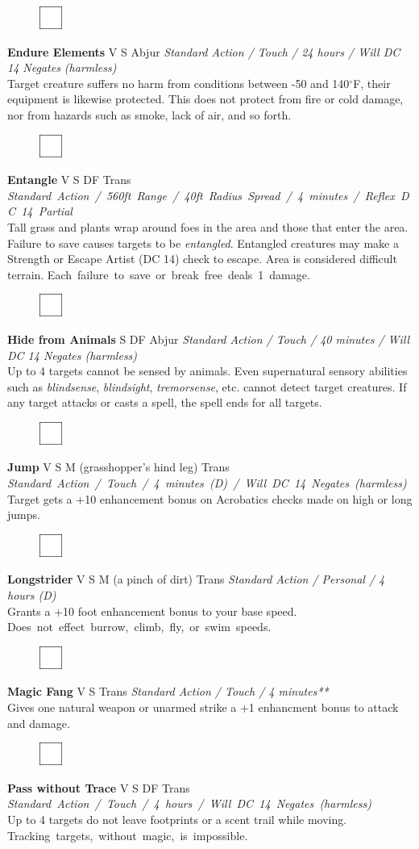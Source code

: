 \documentclass[letterpaper]{article}
\newcommand{\spell}[7]{
\begin{figure}
\vspace{-13pt}
\ifstrequal{#2}{Full}{\includegraphics[width=2em]{Checkbox-Full}}{
                      \includegraphics[width=2em]{Checkbox}}
\ifstrequal{#7}{}{\vspace{-1em}}{\vspace{#7}}
\end{figure}
\noindent \textbf{#1} #3 {
    \ifstrequal{#4}{Conj}{\color{Plum}Conj}{%
    \ifstrequal{#4}{Divin}{\color{YellowOrange}Divin}{%
    \ifstrequal{#4}{Ench}{\color{VioletRed}Ench}{%
    \ifstrequal{#4}{Trans}{\color{LimeGreen}Trans}{%
    \ifstrequal{#4}{Evoc}{\color{RedOrange}Evoc}{%
    \ifstrequal{#4}{Illu}{\color{ProcessBlue}Illu}{%
    \ifstrequal{#4}{Abjur}{\color{CadetBlue}Abjur}{%
    \ifstrequal{#4}{Necro}{\color{Red}Necro}{%
}}}}}}}}}
{\footnotesize \emph{#5}} \\
#6
}
\begin{document}
\spell{Endure Elements}{}{V S}{Abjur}{Standard Action / Touch / 24 hours / Will DC 14 Negates (harmless)}{%
Target creature suffers no harm from conditions between -50 and 140$^{\circ}$F, their equipment is likewise protected.  This does not protect from fire or cold damage, nor from hazards such as smoke, lack of air, and so forth.}{}

\spell{Entangle}{}{V S DF}{Trans}{\mbox{Standard Action / 560ft Range / 40ft Radius Spread / 4 minutes / Reflex DC 14 Partial}}{%
Tall grass and plants wrap around foes in the area and those that enter the area. Failure to save causes targets to be \emph{entangled}. Entangled creatures may make a Strength or Escape Artist (DC 14) check to escape.  Area is considered difficult terrain.  \mbox{Each failure to save or break free deals 1 damage.}}{1em}\\[-1em]

\spell{Hide from Animals}{}{S DF}{Abjur}{Standard Action / Touch / 40 minutes / Will DC 14 Negates (harmless)}{%
Up to 4 targets cannot be sensed by animals.  Even supernatural sensory abilities such as \emph{blindsense}, \emph{blindsight}, \emph{tremorsense}, etc. cannot detect target creatures.  If any target attacks or casts a spell, the spell ends for all targets.}{}

\spell{Jump}{}{V S M (grasshopper's hind leg)}{Trans}{\mbox{Standard Action / Touch / 4 minutes (D) / Will DC 14 Negates (harmless)}}{%
Target gets a +10 enhancement bonus on Acrobatics checks made on high or long jumps.}{}\\[-1em] %

\spell{Longstrider}{}{V S M (a pinch of dirt)}{Trans}{Standard Action / Personal / 4 hours (D)}{%
Grants a +10 foot enhancement bonus to your base speed.  \mbox{Does not effect burrow, climb, fly, or swim speeds.}}{}\\[-1em]

\spell{Magic Fang}{}{V S}{Trans}{Standard Action / Touch / 4 minutes**}{%
Gives one natural weapon or unarmed strike a +1 enhancment bonus to attack and damage.}{}\\[3em]

\spell{Pass without Trace}{}{V S DF}{Trans}{\mbox{Standard Action / Touch / 4 hours / Will DC 14 Negates (harmless)}}{%
Up to 4 targets do not leave footprints or a scent trail while moving.  \mbox{Tracking targets, without magic, is impossible.}}{}\\[-1em]
\end{document}
